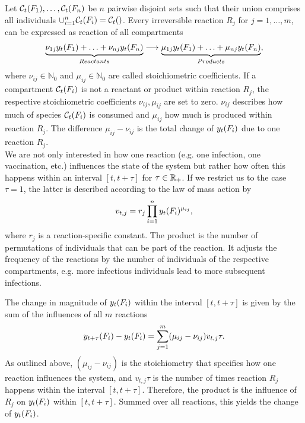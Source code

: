 Let $\mathcal{C}_t(F_1), \dots, \mathcal{C}_t(F_n)$ be $n$ pairwise disjoint sets such that their union comprises all individuals $\cup_{i=1}^n \mathcal{C}_t(F_i) = \mathcal{C}_t()$. Every irreversible reaction $R_j$ for $j = 1, \dots, m$, can be expressed as reaction of all compartments
\begin{align}
\underbrace{\nu_{1j} y_t(F_1) + \hdots + \nu_{nj} y_t(F_n)}_{Reactants} \longrightarrow \underbrace{\mu_{1j} y_t(F_1) + \hdots + \mu_{nj} y_t(F_n)}_{Products},
\end{align}
where $\nu_{ij} \in \mathbb{N}_0$ and $\mu_{ij} \in \mathbb{N}_0$ are called stoichiometric coefficients. If a compartment $\mathcal{C}_t(F_i)$ is not a reactant or product within reaction $R_j$, the respective stoichiometric coefficients $\nu_{ij}, \mu_{ij}$ are set to zero. $\nu_{ij}$ describes how much of species $\mathcal{C}_t(F_i)$ is consumed and $\mu_{ij}$ how much is produced within reaction $R_j$. The difference $\mu_{ij} - \nu_{ij}$ is the total change of $y_t(F_i)$ due to one reaction $R_j$.\\

We are not only interested in how one reaction (e.g. one infection, one vaccination, etc.) influences the state of the system but rather how often this happens within an interval $[t, t+\tau]$ for $\tau \in \mathbb{R}_+$. If we restrict us to the case $\tau = 1$, the latter is described according to the law of mass action by
\begin{align}
\label{eq:change_one_unit}
v_{t,j} = r_j  \prod_{i=1}^n y_t(F_i)^{\mu_{ij}},
\end{align}
where $r_j$ is a reaction-specific constant. The product is the number of permutations of individuals that can be part of the reaction. It adjusts the frequency of the reactions by the number of individuals of the respective compartments, e.g. more infectious individuals lead to more subsequent infections.

The change in magnitude of $y_t(F_i)$ within the interval $[t, t+\tau]$ is given by the sum of the influences of all $m$ reactions
\begin{align}
\label{eq:sys_change}
y_{t+\tau}(F_i) - y_t(F_i) = \sum_{j=1}^m (\mu_{ij} - \nu_{ij}) v_{t,j} \tau.
\end{align}
As outlined above, $(\mu_{ij} - \nu_{ij})$ is the stoichiometry that specifies how one reaction influences the system, and $v_{t,j} \tau$ is the number of times reaction $R_j$ happens within the interval $[t, t+\tau]$. Therefore, the product is the influence of $R_j$ on $y_t(F_i)$ within $[t, t+\tau]$. Summed over all reactions, this yields the change of $y_t(F_i)$. 

